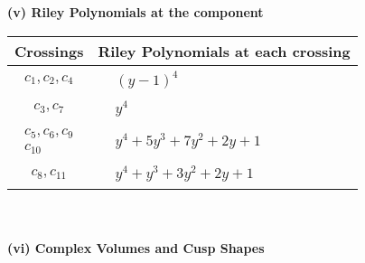 \documentclass[1p]{elsarticle_modified}
\theoremstyle{definition}
\begin{document}
\newpage\renewcommand{\arraystretch}{1}
\flushleft \textbf{(v) Riley Polynomials at the component}\newline \\
\begin{tabular}{m{50pt}|m{274pt}}
Crossings & \hspace{64pt}Riley Polynomials at each crossing \\
\hline $$\begin{aligned}c_{1},c_{2},c_{4}\end{aligned}$$&$\begin{aligned}
&(y-1)^4
\end{aligned}$\\
\hline $$\begin{aligned}c_{3},c_{7}\end{aligned}$$&$\begin{aligned}
&y^4
\end{aligned}$\\
\hline $$\begin{aligned}c_{5},c_{6},c_{9}\\c_{10}\end{aligned}$$&$\begin{aligned}
&y^4+5 y^3+7 y^2+2 y+1
\end{aligned}$\\
\hline $$\begin{aligned}c_{8},c_{11}\end{aligned}$$&$\begin{aligned}
&y^4+y^3+3 y^2+2 y+1
\end{aligned}$\\
\hline
\end{tabular}\\~\\
\newpage\flushleft \textbf{(vi) Complex Volumes and Cusp Shapes}
\end{document}
